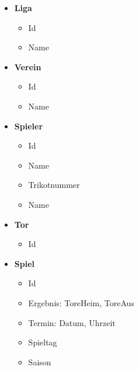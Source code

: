 \documentclass[
10pt,
a4paper
]{scrartcl}
\begin{document}
 \begin{itemize}
  \item \textbf{Liga}
  \begin{itemize}  
     \item Id
      \item Name
   \end{itemize}

 \item\textbf{ Verein}
  \begin{itemize}  
     \item Id
      \item Name
   \end{itemize}

\item \textbf{Spieler}
  \begin{itemize}  
     \item Id
      \item Name
     \item Trikotnummer
      \item Name
   \end{itemize}

\item \textbf{Tor}
  \begin{itemize}  
     \item Id
   \end{itemize}

\item \textbf{Spiel}
  \begin{itemize}  
     \item Id
      \item Ergebnis: ToreHeim, ToreAus
     \item Termin: Datum, Uhrzeit
      \item Spieltag
    \item Saison
   \end{itemize}
 \end{itemize}
\end{document}
